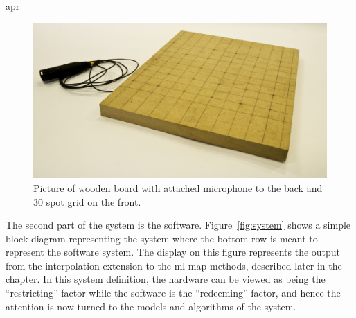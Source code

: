 \DIFaddbegin \label{corrections:wooden}\gls{apr} 

\DIFaddend \begin{figure}[!]
\centering
\includegraphics[width=410 px]{Pad.png}
\caption{Picture of wooden board with attached microphone to the back and 30 spot grid on the front.}\label{fig:Pad}
\end{figure}

The second part of the system is the software. Figure~\ref{fig:system} shows a simple block diagram representing the system where the bottom row is meant to represent the software system. The display on this figure represents the output from the interpolation extension to the \DIFdelbegin {}\DIFdelend \DIFaddbegin \gls{ml} \gls{map} \DIFaddend methods, described later in the chapter. In this system definition, the hardware can be viewed as being the ``restricting'' factor while the software is the ``redeeming'' factor, and hence the attention is now turned to the models and algorithms of the system.

